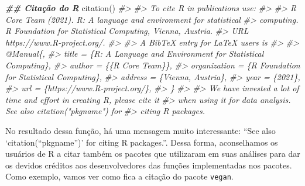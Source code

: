\documentclass[
]{book}
\newenvironment{Shaded}{\begin{snugshade}}{\end{snugshade}}
\newcommand{\CommentTok}[1]{\textcolor[rgb]{0.37,0.37,0.37}{\textit{#1}}}
\newcommand{\DocumentationTok}[1]{\textcolor[rgb]{0.37,0.37,0.37}{\textbf{\textit{#1}}}}
\newcommand{\FunctionTok}[1]{\textcolor[rgb]{0,0,0}{#1}}
\newcommand{\NormalTok}[1]{#1}
\begin{document}
\begin{Shaded}
\begin{Highlighting}[]
\DocumentationTok{\#\# Citação do R}
\FunctionTok{citation}\NormalTok{()}
\CommentTok{\#\textgreater{} }
\CommentTok{\#\textgreater{} To cite R in publications use:}
\CommentTok{\#\textgreater{} }
\CommentTok{\#\textgreater{}   R Core Team (2021). R: A language and environment for statistical}
\CommentTok{\#\textgreater{}   computing. R Foundation for Statistical Computing, Vienna, Austria.}
\CommentTok{\#\textgreater{}   URL https://www.R{-}project.org/.}
\CommentTok{\#\textgreater{} }
\CommentTok{\#\textgreater{} A BibTeX entry for LaTeX users is}
\CommentTok{\#\textgreater{} }
\CommentTok{\#\textgreater{}   @Manual\{,}
\CommentTok{\#\textgreater{}     title = \{R: A Language and Environment for Statistical Computing\},}
\CommentTok{\#\textgreater{}     author = \{\{R Core Team\}\},}
\CommentTok{\#\textgreater{}     organization = \{R Foundation for Statistical Computing\},}
\CommentTok{\#\textgreater{}     address = \{Vienna, Austria\},}
\CommentTok{\#\textgreater{}     year = \{2021\},}
\CommentTok{\#\textgreater{}     url = \{https://www.R{-}project.org/\},}
\CommentTok{\#\textgreater{}   \}}
\CommentTok{\#\textgreater{} }
\CommentTok{\#\textgreater{} We have invested a lot of time and effort in creating R, please cite it}
\CommentTok{\#\textgreater{} when using it for data analysis. See also \textquotesingle{}citation("pkgname")\textquotesingle{} for}
\CommentTok{\#\textgreater{} citing R packages.}
\end{Highlighting}
\end{Shaded}

No resultado dessa função, há uma mensagem muito interessante: ``See also `citation(``pkgname'')' for citing R packages.''. Dessa forma, aconselhamos os usuários de R a citar também os pacotes que utilizaram em suas análises para dar os devidos créditos aos desenvolvedores das funções implementadas nos pacotes. Como exemplo, vamos ver como fica a citação do pacote \texttt{vegan}.
\end{document}
